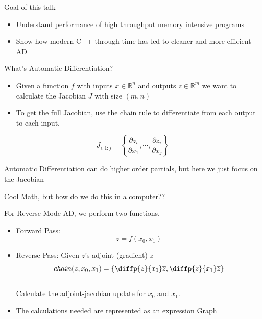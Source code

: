 \documentclass[dvipsnames]{beamer}
\newcommand{\fracp}[2]{\frac{\partial #1}{\partial #2}}
\begin{document}
\begin{frame}{Goal of this talk}
\begin{itemize}
    \item Understand performance of high throughput memory intensive programs
    \item Show how modern C++ through time has led to cleaner and more efficient AD
\end{itemize}
\end{frame}


\begin{frame}{What's Automatic Differentiation?}

\begin{itemize}
    \item Given a function $f$ with inputs $x\in\mathbb{R}^n$ and outputs $z\in \mathbb{R}^m$ we want to calculate the Jacobian $J$ with size $(m, n)$
    \item To get the full Jacobian, use the chain rule to differentiate from each output to each input.
\end{itemize}


\begin{equation*}
    J_{i, 1:j} = \left\{\fracp{z_i}{x_1}, \cdots, \fracp{z_i}{x_j}\right\}
\end{equation*}

Automatic Differentiation can do higher order partials, but here we just focus on the Jacobian

\end{frame}

\begin{frame}{Cool Math, but how do we do this in a computer??}

 For Reverse Mode AD, we perform two functions.

\begin{itemize}
 \item Forward Pass:
 \begin{equation*}
     z = f(x_0, x_1)
 \end{equation*}
 \item Reverse Pass: Given $z$'s adjoint (gradient) $\overline{z}$
 \begin{equation*}
 chain(z, x_0, x_{1}) = \left\{\diffp{z}{{x_0}}\overline{z},\diffp{z}{{x_1}}\overline{z}\right\}
 \end{equation*}
 \\Calculate the adjoint-jacobian update for $x_0$ and $x_1$.
 \item The calculations needed are represented as an expression Graph
\end{itemize}
\end{frame}
\end{document}
